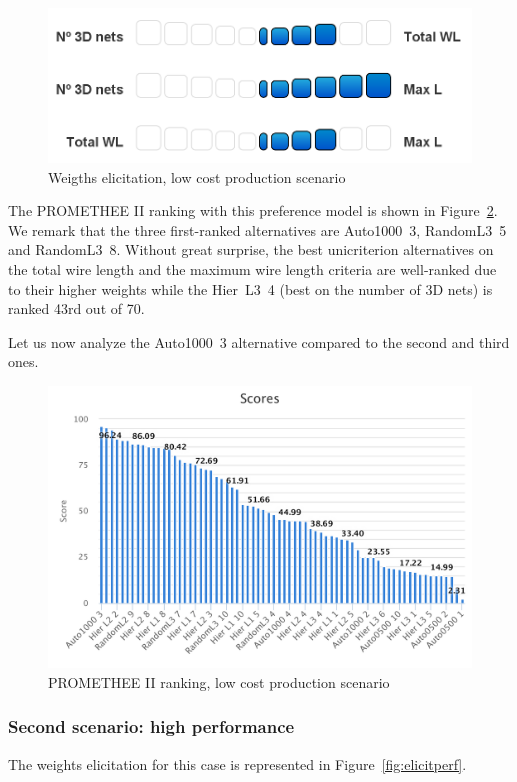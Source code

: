 \documentclass{svmult}
\begin{document}
\begin{figure}[h!]
    \centering
    \includegraphics[width=0.6\linewidth]{elicitcost.png}
    \caption{Weigths elicitation, low cost production scenario}
    \label{fig:elicitcost}
\end{figure}

The PROMETHEE II ranking with this preference model is shown in Figure~\ref{fig:rankingcost}. We remark that the three first-ranked alternatives are Auto1000~3, RandomL3~5 and RandomL3~8. Without great surprise, the best unicriterion alternatives on the total wire length and the maximum wire length criteria are well-ranked due to their higher weights while the Hier~L3~4 (best on the number of 3D nets) is ranked 43rd out of 70.

Let us now analyze the Auto1000~3 alternative compared to the second and third ones.

\begin{figure}[h!]
    \centering
    \includegraphics[width=\linewidth]{rankingcost}
    \caption{PROMETHEE II ranking, low cost production scenario}
    \label{fig:rankingcost}
\end{figure}

\subsubsection*{Second scenario: high performance}
The weights elicitation for this case is represented in Figure~\ref{fig:elicitperf}.
\end{document}
